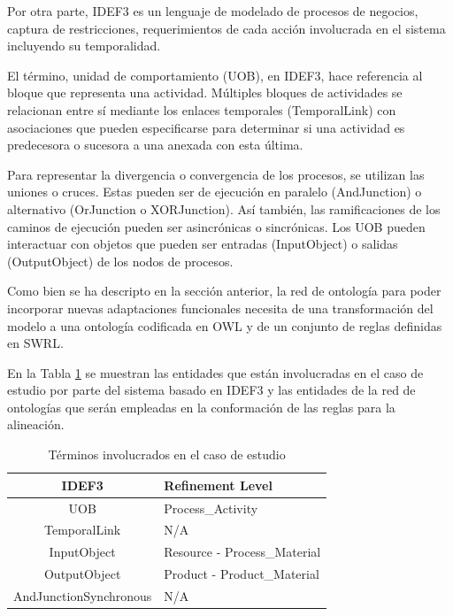 \documentclass[journal]{IEEEtran}
\begin{document}
Por otra parte, IDEF3 es un lenguaje de modelado de procesos de negocios, captura de restricciones, requerimientos de cada acci\'on involucrada en el sistema incluyendo su temporalidad. 

El t\'ermino, unidad de comportamiento (UOB), en IDEF3, hace referencia al bloque que representa una actividad. M\'ultiples bloques de actividades se relacionan entre s\'i mediante los enlaces temporales (TemporalLink) con asociaciones que pueden especificarse para determinar si una actividad es predecesora o sucesora a una anexada con esta \'ultima. 

Para representar la divergencia o convergencia de los procesos, se utilizan las uniones o cruces. Estas pueden ser de ejecuci\'on en paralelo (AndJunction) o alternativo (OrJunction o XORJunction). As\'i tambi\'en, las ramificaciones de los caminos de ejecuci\'on pueden ser asincr\'onicas o sincr\'onicas. Los UOB pueden interactuar con objetos que pueden ser entradas (InputObject) o salidas (OutputObject) de los nodos de procesos. 

Como bien se ha descripto en la secci\'on anterior, la red de ontolog\'ia para poder incorporar nuevas adaptaciones funcionales necesita de una transformaci\'on del modelo a una ontolog\'ia codificada en OWL y de un conjunto de reglas definidas en SWRL.

En la Tabla \ref{tabla7} se muestran las entidades que est\'an involucradas en el caso de estudio por parte del sistema basado en IDEF3 y las entidades de la red de ontolog\'ias que ser\'an empleadas en la conformaci\'on de las reglas para la alineaci\'on.

\begin{table}[!t]
\renewcommand{\arraystretch}{1.3}
\caption{T\'erminos involucrados en el caso de estudio}
\label{tabla7}
\centering
\begin{tabular}{|c|p{4cm}|}
\hline
\bfseries IDEF3 & \bfseries Refinement Level \\ \hline
UOB & Process\_Activity \\ \cline{1-2}
TemporalLink & N/A \\ \cline{1-2}
InputObject & Resource - Process\_Material \\ \hline   
OutputObject & Product - Product\_Material \\ \hline
AndJunctionSynchronous & N/A \\ 
\hline
\end{tabular}
\end{table}
\end{document}
